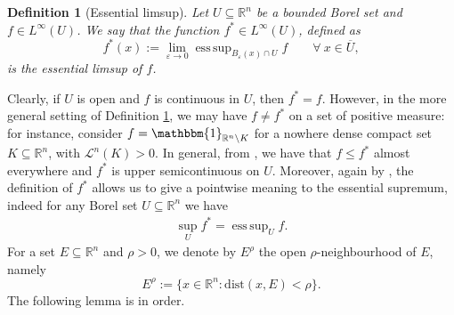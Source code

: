 \documentclass[a4paper,11pt]{article}
\numberwithin{equation}{section}
\newtheorem{Definition}[Theorem]{Definition}
\newcommand{\numberset}{\mathbb}
\newcommand{\eps}{\varepsilon}
\newcommand{\R}{\numberset{R}}
\DeclareMathOperator*{\esssup}{ess\,sup}
\theoremstyle{definition}
\begin{document}
\begin{Definition}[Essential limsup]\label{ess limsup}
Let $U\subseteq\R^n$ be a bounded Borel set and $f\in L^\infty(U)$. We say that the function $f^*\in L^\infty(U)$, defined as
$$
f^*(x):=\lim_{\eps\to  0}\esssup_{B_\eps(x)\cap U}f\qquad\forall\  x\in \overline U,
$$
is the essential limsup of $f$.
\end{Definition}
Clearly, if $U$ is open and $f$ is continuous in $U$, then $f^*=f$. 
However, in the more general setting of Definition \ref{ess limsup}, we may have $f\neq f^*$ on a set of positive measure: for instance, consider $f=\mathbbm{1}_{\R^n\setminus K}$ for a nowhere dense compact set $K\subseteq\R^n$, with $\mathscr L^n(K)>0$. In general, from \cite[Proposition 9]{KSIAM}, we have that $f\leq f^*$ almost everywhere and $f^*$ is upper semicontinuous on $U$. Moreover, again by \cite[Proposition 9]{KSIAM}, the definition of $f^*$ allows us to give a pointwise meaning to the essential supremum, indeed for any Borel set $U\subseteq\R^n$ we have
\begin{align}\label{pointwise sup}
\sup_U f^*=\esssup_U f.
\end{align}
For a set $E\subseteq\R^n$ and $\rho>0$, we denote by $E^\rho$ the open $\rho$-neighbourhood of $E$, namely 
\[
E^\rho:=\big\{ x\in\R^n: \mathrm{dist}(x, E)<\rho \big\}.
\]
The following lemma is in order.
\end{document}
